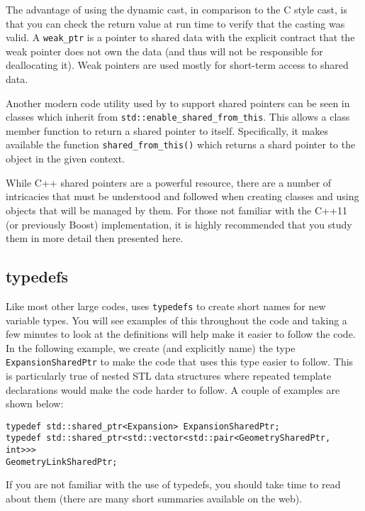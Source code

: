 The advantage of using the dynamic cast, in comparison to the C style
cast, is that you can check the return value at run time to verify
that the casting was valid.  A \lstinline|weak_ptr| is a pointer to shared
data with the explicit contract that the weak pointer does not own
the data (and thus will not be responsible for deallocating it).
Weak pointers are used mostly for short-term access to shared data.

Another modern code utility used by {\nek} to support shared
pointers can be seen in {\nek} classes which inherit from
\lstinline|std::enable_shared_from_this|. This allows a class member function to return a shared pointer to itself. Specifically, it makes available the function \lstinline|shared_from_this()| which returns a shard pointer to the object in the given context.

While C++ shared pointers are a powerful resource, there are a
number of intricacies that must be understood and followed when
creating classes and using objects that will be managed by them.
For those not familiar with the C++11 (or previously Boost)
implementation, it is highly recommended that you study them in more
detail then presented here.
  
\subsection{typedefs}
Like most other large codes, {\nek} uses
\lstinline{typedefs} to create short names for new variable types.  You will
see examples of this throughout the code and taking a few minutes to
look at the definitions will help make it easier to follow the code.
In the following example, we create (and explicitly name) the type
\lstinline{ExpansionSharedPtr} to make the code that uses this type easier
to follow. This is particularly true of nested STL data structures where repeated template declarations would make the code harder to follow. A couple of examples are shown below:
\begin{lstlisting}
typedef std::shared_ptr<Expansion> ExpansionSharedPtr;
typedef std::shared_ptr<std::vector<std::pair<GeometrySharedPtr, int>>>
GeometryLinkSharedPtr;
\end{lstlisting}
If you are not familiar with the use of typedefs, you should take
time to read about them (there are many short summaries
available on the web).

